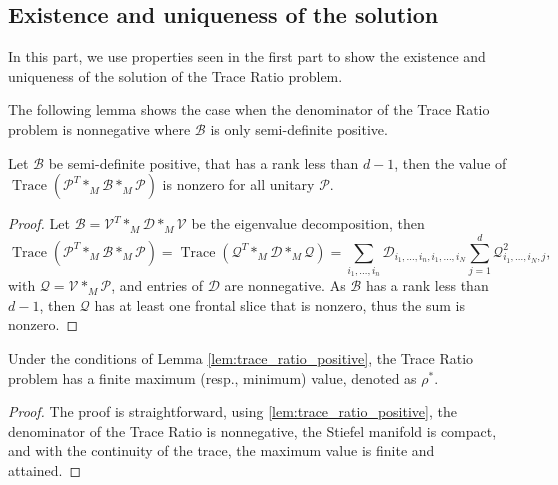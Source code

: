 \documentclass{siamltex}
\begin{document}
\subsection{Existence and uniqueness of the solution}
In this part, we use properties seen in the first part to show the existence and uniqueness of the solution of the Trace Ratio problem.
\medskip

The following lemma shows the case when the denominator of the Trace Ratio problem is nonnegative where $\mathcal{B}$ is only semi-definite positive.
\begin{lemma}\label{lem:trace_ratio_positive}
Let $\mathcal{B}$ be semi-definite positive, that has a rank less than $d-1$, then the value of $\operatorname{Trace}\left( \mathcal{P}^T *_M \mathcal{B} *_M \mathcal{P}\right)$ is nonzero for all unitary $\mathcal{P}$.
\end{lemma}
\begin{proof}
Let $\mathcal{B}=\mathcal{V}^T *_M \mathcal{D} *_M \mathcal{V}$ be the eigenvalue decomposition, then $$\operatorname{Trace}\left(\mathcal{P}^T *_M \mathcal{B} *_M \mathcal{P}\right)=\operatorname{Trace}\left(\mathcal{Q}^T *_M \mathcal{D} *_M \mathcal{Q}\right)=\sum_{i_1,\ldots,i_n} \mathcal{D}_{i_1,\ldots,i_n,i_1,\ldots,i_N} \sum_{j=1}^d \mathcal{Q}_{i_1,\ldots,i_N,j}^2,$$
with $\mathcal{Q}=\mathcal{V} *_M \mathcal{P}$, and entries of $\mathcal{D}$ are nonnegative.
As $\mathcal{B}$ has a rank less than $d-1$, then $\mathcal{Q}$ has at least one frontal slice that is nonzero, thus the sum is nonzero. 
\end{proof}
\medskip
\begin{proposition}
Under the conditions of Lemma \ref{lem:trace_ratio_positive}, the Trace Ratio problem has a finite maximum (resp., minimum) value, denoted as $\rho^*$.
\end{proposition}
\begin{proof}
The proof is straightforward, using \ref{lem:trace_ratio_positive}, the denominator of the Trace Ratio is nonnegative, the Stiefel manifold is compact, and with the continuity of the trace, the maximum value is finite and attained.
\end{proof}
\end{document}
